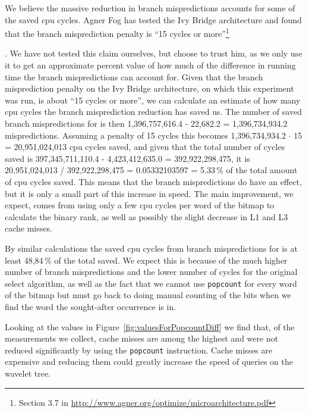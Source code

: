We believe the massive reduction in branch mispredictions accounts for some of the saved cpu cycles.
Agner Fog has tested the Ivy Bridge architecture and found that the branch misprediction penalty is “15 cycles or more”\footnote{Section 3.7 in \url{http://www.agner.org/optimize/microarchitecture.pdf}}\addtocounter{footnote}{-1}\addtocounter{Hfootnote}{-1}.
We have not tested this claim ourselves, but choose to trust him, as we only use it to  get an approximate percent value of how much of the difference in running time the branch mispredictions can account for.
Given that the branch misprediction penalty on the Ivy Bridge architecture, on which this experiment was run, is about “15 cycles or more”\footnotemark, we can calculate an estimate of how many cpu cycles the branch misprediction reduction has saved us.
The number of saved branch mispredictions for  is then 1,396,757,616.4 - 22,682.2 = 1,396,734,934.2 mispredictions. Assuming a penalty of 15 cycles this becomes 1,396,734,934.2 $\cdot$ 15 = 20,951,024,013 cpu cycles saved, and given that the total number of cycles saved is 397,345,711,110.4 - 4,423,412,635.0 = 392,922,298,475, it is 20,951,024,013 / 392,922,298,475 = 0.05332103597 = 5.33\,\% of the total amount of cpu cycles saved.
This means that the branch mispredictions do have an effect, but it is only a small part of this increase in speed. The main improvement, we expect, comes from using only a few cpu cycles per word of the bitmap to calculate the binary rank, as well as possibly the slight decrease in L1 and L3 cache misses.



By similar calculations the saved cpu cycles from branch mispredictions for  is at least 48,84\,\% of the total saved. We expect this is because of the much higher number of branch mispredictions and the lower number of cycles for the original select algorithm, as well as the fact that we cannot use \texttt{popcount} for every word of the bitmap but must go back to doing manual counting of the bits when we find the word the sought-after occurrence is in.

Looking at the values in Figure~\ref{fig:valuesForPopcountDiff} we find that, of the measurements we collect, cache misses are among the highest and were not reduced significantly by using the \texttt{popcount} instruction.
Cache misses are expensive and reducing them could greatly increase the speed of queries on the wavelet tree.



